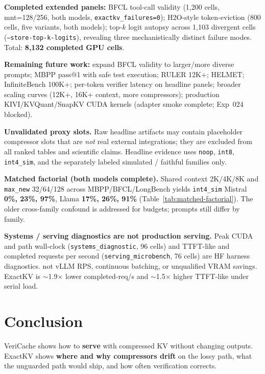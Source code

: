 \documentclass[11pt]{article}
\begin{document}
\textbf{Completed extended panels:} BFCL tool-call validity (1,200 cells, mnt=128/256,
both models, \texttt{exactkv\_failures=0}); H2O-style token-eviction (800 cells, five
variants, both models); top-$k$ logit autopsy across 1,103 divergent cells
(\texttt{--store-top-k-logits}), revealing three mechanistically distinct failure modes.
Total: \textbf{8,132 completed GPU cells}.

\textbf{Remaining future work:} expand BFCL validity to larger/more diverse prompts;
MBPP pass@1 with safe test execution; RULER 12K+; HELMET; InfiniteBench 100K+;
per-token verifier latency on headline panels; broader scaling curves (12K+, 16K+
context, more compressors); production KIVI/KVQuant/SnapKV CUDA kernels (adapter
smoke complete; Exp~024 blocked).

\noindent\textbf{Unvalidated proxy slots.} Raw headline artifacts may contain
placeholder compressor slots that are \emph{not} real external integrations; they
are excluded from all ranked tables and scientific claims. Headline evidence uses
\texttt{noop}, \texttt{int8}, \texttt{int4\_sim}, and the separately labeled
simulated / faithful families only.

\begin{sloppypar}
\noindent\textbf{Matched factorial (both models complete).}
Shared context 2K/4K/8K and \texttt{max\_new} 32/64/128 across MBPP/BFCL/LongBench
yields \texttt{int4\_sim} Mistral \textbf{0\%, 23\%, 97\%}, Llama \textbf{17\%, 26\%, 91\%}
(Table~\ref{tab:matched-factorial}). The older cross-family confound is addressed for
budgets; prompts still differ by family.

\noindent\textbf{Systems / serving diagnostics are not production serving.}
Peak CUDA and path wall-clock (\texttt{systems\_diagnostic}, 96 cells) and
TTFT-like and completed requests per second (\texttt{serving\_microbench}, 76 cells) are HF
harness diagnostics. not vLLM RPS, continuous batching, or unqualified VRAM
savings. ExactKV is $\sim$1.9$\times$ lower completed-req/s and $\sim$1.5$\times$
higher TTFT-like under serial load.
\end{sloppypar}

\section{Conclusion}

VeriCache shows how to \textbf{serve} with compressed KV without changing outputs.
ExactKV shows \textbf{where and why compressors drift} on the lossy path, what the
unguarded path would ship, and how often verification corrects.
\end{document}
